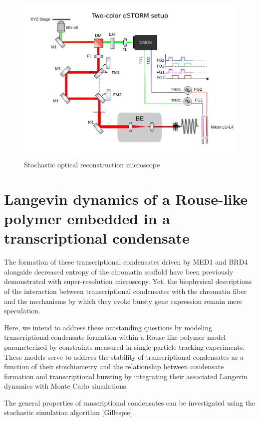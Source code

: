 \documentclass{article}
\begin{document}
\begin{figure}
\centering
\includegraphics[width=12cm]{dSTORM.png}
\caption{Stochastic optical reconstruction microscope}
\end{figure}

\section{Langevin dynamics of a Rouse-like polymer embedded in a transcriptional condensate}

The formation of these transcriptional condensates driven by MED1 and BRD4 alongside decreased entropy of the chromatin scaffold have been previously demonstrated with super-resolution microscopy. Yet, the biophysical descriptions of the interaction between transcriptional condensates with the chromatin fiber and the mechanisms by which they evoke bursty gene expression remain mere speculation. 

Here, we intend to address these outstanding questions by modeling transcriptional condensate formation within a Rouse-like polymer model parameterized by constraints measured in single particle tracking experiments. These models serve to address the stability of transcriptional condensates as a function of their stoichiometry and the relationship between condensate formation and transcriptional bursting by integrating their associated Langevin dynamics with Monte Carlo simulations. 


The general properties of ranscriptional condensates can be investigated using the stochastic simulation algorithm [Gillespie].

 



 
\end{document}
